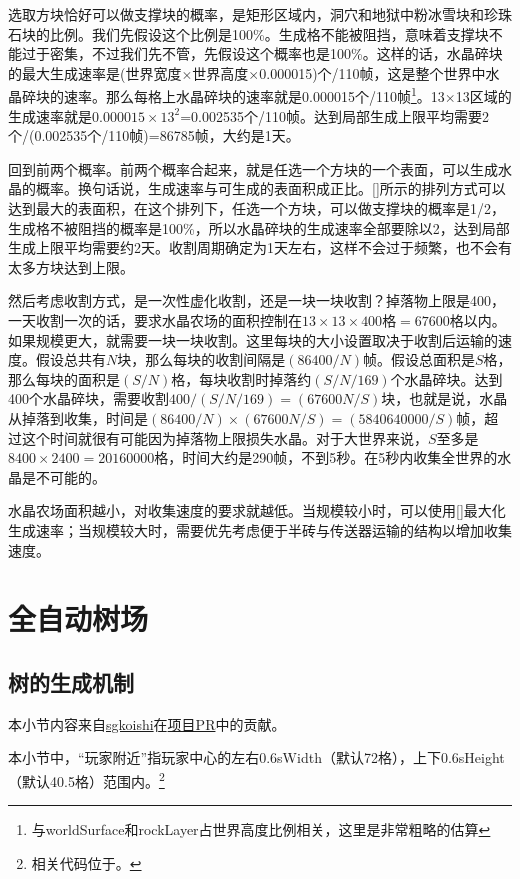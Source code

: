 选取方块恰好可以做支撑块的概率，是矩形区域内，洞穴和地狱中粉冰雪块和珍珠石块的比例。我们先假设这个比例是100\%。生成格不能被阻挡，意味着支撑块不能过于密集，不过我们先不管，先假设这个概率也是100\%。这样的话，水晶碎块的最大生成速率是(世界宽度$\times$世界高度$\times$0.000015)个/110帧，这是整个世界中水晶碎块的速率。那么每格上水晶碎块的速率就是0.000015个/110帧\footnote{与worldSurface和rockLayer占世界高度比例相关，这里是非常粗略的估算}。13$\times$13区域的生成速率就是$0.000015\times 13^2$=0.002535个/110帧。达到局部生成上限平均需要2个/(0.002535个/110帧)=86785帧，大约是1天。

回到前两个概率。前两个概率合起来，就是任选一个方块的一个表面，可以生成水晶的概率。换句话说，生成速率与可生成的表面积成正比。\autoref{}所示的排列方式可以达到最大的表面积，在这个排列下，任选一个方块，可以做支撑块的概率是1/2，生成格不被阻挡的概率是100\%，所以水晶碎块的生成速率全部要除以2，达到局部生成上限平均需要约2天。收割周期确定为1天左右，这样不会过于频繁，也不会有太多方块达到上限。

然后考虑收割方式，是一次性虚化收割，还是一块一块收割？掉落物上限是400，一天收割一次的话，要求水晶农场的面积控制在$13\times 13\times 400\textrm{格}=67600$格以内。如果规模更大，就需要一块一块收割。这里每块的大小设置取决于收割后运输的速度。假设总共有$N$块，那么每块的收割间隔是$(86400/N)$帧。假设总面积是$S$格，那么每块的面积是$(S/N)$格，每块收割时掉落约$(S/N/169)$个水晶碎块。达到400个水晶碎块，需要收割$400/(S/N/169)=(67600N/S)$块，也就是说，水晶从掉落到收集，时间是$(86400/N)\times(67600N/S)=(5840640000/S)$帧，超过这个时间就很有可能因为掉落物上限损失水晶。对于大世界来说，$S$至多是$8400\times2400=20160000$格，时间大约是290帧，不到5秒。在5秒内收集全世界的水晶是不可能的。

水晶农场面积越小，对收集速度的要求就越低。当规模较小时，可以使用\autoref{}最大化生成速率；当规模较大时，需要优先考虑便于半砖与传送器运输的结构以增加收集速度。

\section{全自动树场}
\subsection{树的生成机制}
\begin{note}
本小节内容来自\href{https://github.com/sgkoishi}{sgkoishi}在\href{https://github.com/putianyi889/TerrariaWiringTutorial/pull/16}{项目PR}中的贡献。
\end{note}
本小节中，“玩家附近”指玩家中心的左右0.6sWidth（默认72格），上下0.6sHeight（默认40.5格）范围内。\footnote{相关代码位于。}


